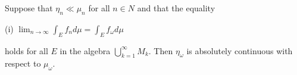 Suppose that $\eta_n \ll \mu_n$ for all $n \in N$ and that the equality

(i) $\lim_{n \to \infty} \int_E f_n d\mu = \int_E f_\omega d\mu$

holds for all $E$ in the algebra $\bigcup_{k=1}^{\infty} M_k$. Then $\eta_\omega$ is absolutely continuous with respect to $\mu_\omega$.